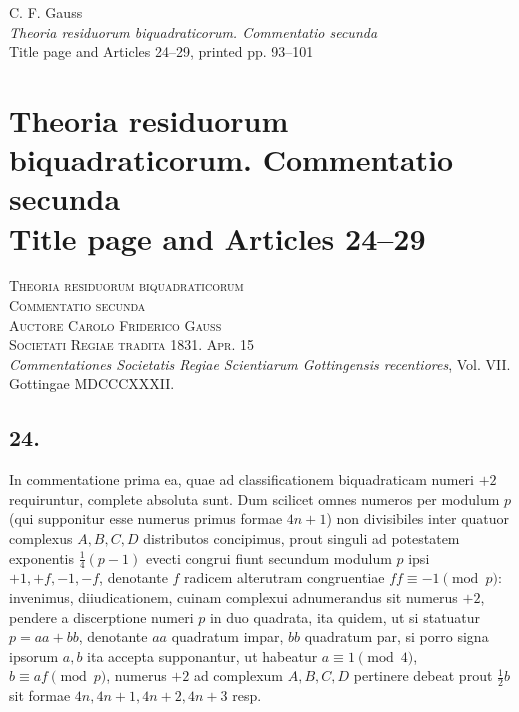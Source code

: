 \documentclass[12pt]{article}
\begin{document}
\begin{center}
{\Large C. F. Gauss}\\[3pt]
{\large \emph{Theoria residuorum biquadraticorum. Commentatio secunda}}\\[3pt]
{\large Title page and Articles 24--29, printed pp. 93--101}
\end{center}

\section*{Theoria residuorum biquadraticorum. Commentatio secunda\\
Title page and Articles 24--29}

\begin{center}
\textsc{Theoria residuorum biquadraticorum}\\
\textsc{Commentatio secunda}\\[2pt]
\textsc{Auctore Carolo Friderico Gauss}\\
\textsc{Societati Regiae tradita 1831. Apr. 15}\\
\emph{Commentationes Societatis Regiae Scientiarum Gottingensis recentiores}, Vol. VII.\\
Gottingae MDCCCXXXII.
\end{center}

\subsection*{24.}

In commentatione prima ea, quae ad classificationem biquadraticam numeri $+2$ requiruntur, complete absoluta sunt. Dum scilicet omnes numeros per modulum $p$ (qui supponitur esse numerus primus formae $4n+1$) non divisibiles inter quatuor complexus $A,B,C,D$ distributos concipimus, prout singuli ad potestatem exponentis $\frac14(p-1)$ evecti congrui fiunt secundum modulum $p$ ipsi $+1,+f,-1,-f$, denotante $f$ radicem alterutram congruentiae $ff\equiv -1\pmod p$: invenimus, diiudicationem, cuinam complexui adnumerandus sit numerus $+2$, pendere a discerptione numeri $p$ in duo quadrata, ita quidem, ut si statuatur $p=aa+bb$, denotante $aa$ quadratum impar, $bb$ quadratum par, si porro signa ipsorum $a,b$ ita accepta supponantur, ut habeatur $a\equiv 1\pmod 4$, $b\equiv af\pmod p$, numerus $+2$ ad complexum $A,B,C,D$ pertinere debeat prout $\frac12 b$ sit formae $4n,4n+1,4n+2,4n+3$ resp.
\end{document}
